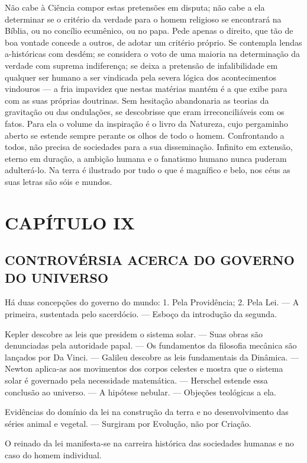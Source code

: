 \documentclass[11pt,a5paper,twoside,openany]{book}
\begin{document}
Não cabe à Ciência compor estas pretensões em disputa; não cabe a ela determinar se o critério da verdade para o homem religioso se encontrará na Bíblia, ou no concílio ecumênico, ou no papa. Pede apenas o direito, que tão de boa vontade concede a outros, de adotar um critério próprio. Se contempla lendas a-históricas com desdém; se considera o voto de uma maioria na determinação da verdade com suprema indiferença; se deixa a pretensão de infalibilidade em qualquer ser humano a ser vindicada pela severa lógica dos acontecimentos vindouros — a fria impavidez que nestas matérias mantém é a que exibe para com as suas próprias doutrinas. Sem hesitação abandonaria as teorias da gravitação ou das ondulações, se descobrisse que eram irreconciliáveis com os fatos. Para ela o volume da inspiração é o livro da Natureza, cujo pergaminho aberto se estende sempre perante os olhos de todo o homem. Confrontando a todos, não precisa de sociedades para a sua disseminação. Infinito em extensão, eterno em duração, a ambição humana e o fanatismo humano nunca puderam adulterá-lo. Na terra é ilustrado por tudo o que é magnífico e belo, nos céus as suas letras são sóis e mundos.

\clearpage
\chapter*{CAPÍTULO IX}
\section*{CONTROVÉRSIA ACERCA DO GOVERNO DO UNIVERSO}
Há duas concepções do governo do mundo: 1. Pela Providência; 2. Pela Lei. — A primeira, sustentada pelo sacerdócio. — Esboço da introdução da segunda.

Kepler descobre as leis que presidem o sistema solar. — Suas obras são denunciadas pela autoridade papal. — Os fundamentos da filosofia mecânica são lançados por Da Vinci. — Galileu descobre as leis fundamentais da Dinâmica. — Newton aplica-as aos movimentos dos corpos celestes e mostra que o sistema solar é governado pela necessidade matemática. — Herschel estende essa conclusão ao universo. — A hipótese nebular. — Objeções teológicas a ela.

Evidências do domínio da lei na construção da terra e no desenvolvimento das séries animal e vegetal. — Surgiram por Evolução, não por Criação.

O reinado da lei manifesta-se na carreira histórica das sociedades humanas e no caso do homem individual.
\end{document}
